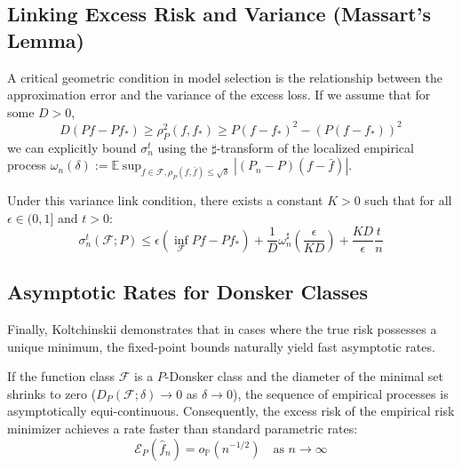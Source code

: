 \subsection{Linking Excess Risk and Variance (Massart's Lemma)}
A critical geometric condition in model selection is the relationship between the approximation error and the variance of the excess loss. If we assume that for some $D > 0$,
\[
  D(Pf - Pf_*) \ge \rho_P^2(f, f_*) \ge P(f - f_*)^2 - (P(f - f_*))^2
\]
we can explicitly bound $\sigma_n^t$ using the $\sharp$-transform of the localized empirical process $\omega_n(\delta) := \mathbb{E}\sup_{f\in\mathcal{F}, \rho_P(f,\bar{f}) \le \sqrt{\delta}} |(P_n - P)(f - \bar{f})|$.

\vspace{0.5em}
\begin{lemma}
  Under this variance link condition, there exists a constant $K > 0$ such that for all $\epsilon \in (0, 1]$ and $t > 0$:
  \[
    \sigma_n^t(\mathcal{F}; P) \le \epsilon(\inf_{\mathcal{F}} Pf - Pf_*) + \frac{1}{D}\omega_n^{\sharp}\left(\frac{\epsilon}{KD}\right) + \frac{KD}{\epsilon}\frac{t}{n}
  \]
\end{lemma}

\subsection{ Asymptotic Rates for Donsker Classes}
Finally, Koltchinskii demonstrates that in cases where the true risk possesses a unique minimum, the fixed-point bounds naturally yield fast asymptotic rates.

\vspace{0.5em}
\begin{theorem}
  If the function class $\mathcal{F}$ is a $P$-Donsker class and the diameter of the minimal set shrinks to zero ($D_P(\mathcal{F}; \delta) \to 0$ as $\delta \to 0$), the sequence of empirical processes is asymptotically equi-continuous. Consequently, the excess risk of the empirical risk minimizer achieves a rate faster than standard parametric rates:
  \[
    \mathcal{E}_P(\hat{f}_n) = o_{\mathbb{P}}(n^{-1/2}) \quad \text{as } n \to \infty
  \]
\end{theorem}
